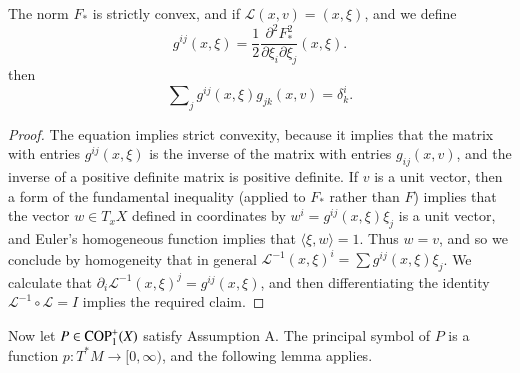 \begin{corollary}
  The norm $F_*$ is strictly convex, and if $\mathcal{L}(x,v) = (x,\xi)$, and we define
  \[ g^{ij}(x,\xi) = \frac{1}{2} \frac{\partial^2 F_*^2}{\partial \xi_i \partial \xi_j}(x,\xi). \]
  then
  \[ \sum\nolimits_j g^{ij}(x,\xi) g_{jk}(x,v) = \delta^i_k. \]
\end{corollary}
\begin{proof}
  The equation implies strict convexity, because it implies that the matrix with entries $g^{ij}(x,\xi)$ is the inverse of the matrix with entries $g_{ij}(x,v)$, and the inverse of a positive definite matrix is positive definite. If $v$ is a unit vector, then a form of the fundamental inequality (applied to $F_*$ rather than $F$) implies that the vector $w \in T_x X$ defined in coordinates by $w^i = g^{ij}(x,\xi) \xi_j$ is a unit vector, and Euler's homogeneous function implies that $\langle \xi, w \rangle = 1$. Thus $w = v$, and so we conclude by homogeneity that in general $\mathcal{L}^{-1}(x,\xi)^i = \sum g^{ij}(x,\xi) \xi_j$. We calculate that $\partial_i \mathcal{L}^{-1}(x,\xi)^j = g^{ij}(x,\xi)$, and then differentiating the identity $\mathcal{L}^{-1} \circ \mathcal{L} = I$ implies the required claim.
\end{proof}

Now let $P \in {\text{COP}^{+}_{{1}}}(X)$ satisfy Assumption A. The principal symbol of $P$ is a function $p: T^* M \to [0,\infty)$, and the following lemma applies.

